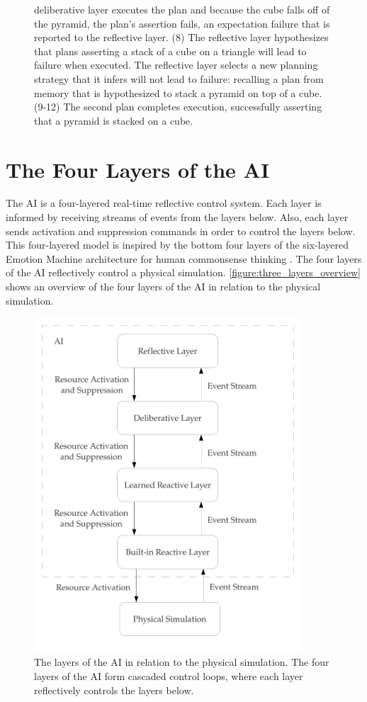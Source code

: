 \begin{figure}
{  deliberative layer executes the plan and because the cube falls off
  of the pyramid, the plan's assertion fails, an expectation failure
  that is reported to the reflective layer.  (8) The reflective layer
  hypothesizes that plans asserting a stack of a cube on a triangle
  will lead to failure when executed.  The reflective layer selects a
  new planning strategy that it infers will not lead to failure:
  recalling a plan from memory that is hypothesized to stack a pyramid
  on top of a cube.  (9-12) The second plan completes execution,
  successfully asserting that a pyramid is stacked on a cube.}
\label{figure:implemented_example_learning_storyboard}
\end{figure}

\section{The Four Layers of the AI}

The AI is a four-layered real-time reflective control system.  Each
layer is informed by receiving streams of events from the layers
below.  Also, each layer sends activation and suppression commands in
order to control the layers below.  This four-layered model is
inspired by the bottom four layers of the six-layered Emotion Machine
architecture for human commonsense thinking \cite[]{minsky:2006}.  The
four layers of the AI reflectively control a physical simulation.
{\mbox{\autoref{figure:three_layers_overview}}} shows an overview of
the four layers of the AI in relation to the physical simulation.
\begin{figure}
\begin{center}
\includegraphics[width=10cm]{gfx/three_layers_overview}
\end{center}
\caption[The four layers of the AI in relation to the physical
  simulation.]{The layers of the AI in relation to the physical
  simulation.  The four layers of the AI form cascaded control loops,
  where each layer reflectively controls the layers below.}
\label{figure:three_layers_overview}
\end{figure}


